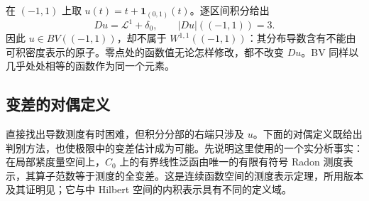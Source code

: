 \begin{example}\label{g3:exm:bv-absolutely-continuous-and-atom}
	在 \((-1,1)\) 上取 \(u(t)=t+\mathbf1_{(0,1)}(t)\)。逐区间积分给出
	\[
		Du=\mathcal L^1+\delta_0,\qquad
		|Du|((-1,1))=3.
	\]
	因此 \(u\in BV((-1,1))\)，却不属于 \(W^{1,1}((-1,1))\)：其分布导数含有不能由可积密度表示的原子。零点处的函数值无论怎样修改，都不改变 \(Du\)。BV 同样以几乎处处相等的函数作为同一个元素。
\end{example}

\subsection{变差的对偶定义}
\label{g3:subsec:2101:02}
直接找出导数测度有时困难，但积分分部的右端只涉及 \(u\)。下面的对偶定义既给出判别方法，也使极限中的变差估计成为可能。先说明这里使用的一个实分析事实：在局部紧度量空间上，\(C_0\) 上的有界线性泛函由唯一的有限有符号 Radon 测度表示，其算子范数等于测度的全变差。这是连续函数空间的测度表示定理，所用版本及其证明见\cite[第4节，定理4.1，第18--21页]{Simon1983}；它与中 Hilbert 空间的内积表示具有不同的定义域。

